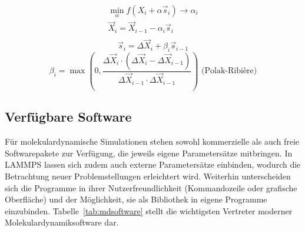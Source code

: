 \begin{gather}
  \label{eq:cg-linesearch1}
  \min_\alpha f(X_i+\alpha \vec s_i) \rightarrow \alpha_i \\
  \label{eq:cg-linesearch2}
  \vec X_i = \vec X_{i-1} - \alpha_i \vec s_i\\
\end{gather}
\begin{equation}
  \label{eq:pr1}
  \vec s_i = \Delta \vec X_i + \beta_i \vec s_{i-1}
\end{equation}
\begin{equation}
  \label{eq:pr2}
  \beta_i = \max \left(0, \frac{\Delta \vec X_i \cdot \left(\Delta \vec X_i - \Delta \vec X_{i-1}\right)}{\Delta \vec X_{i-1} \cdot \Delta \vec X_{i-1}}\right) \text{~(Polak-Ribière)}
\end{equation}







\subsection{Verfügbare Software}

Für molekulardynamische Simulationen stehen sowohl kommerzielle als auch freie Softwarepakete zur Verfügung, die jeweils eigene Parametersätze mitbringen.
In LAMMPS lassen sich zudem auch externe Parametersätze einbinden, wodurch die Betrachtung neuer Problemstellungen erleichtert wird.
Weiterhin unterscheiden sich die Programme in ihrer Nutzerfreundlichkeit (Kommandozeile oder grafische Oberfläche) und der Möglichkeit, sie als Bibliothek in eigene Programme einzubinden.
Tabelle~\ref{tab:mdsoftware} stellt die wichtigsten Vertreter moderner Molekulardynamiksoftware dar.


